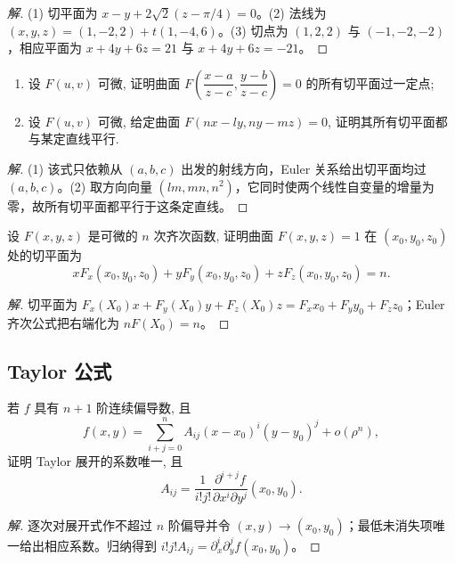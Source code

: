 \documentclass[../../数学分析培优讲义(答案版).tex]{subfiles}
\begin{document}
\begin{proof}[解]
(1) 切平面为 $x-y+2\sqrt{2}(z-\pi/4)=0$。(2) 法线为 $(x,y,z)=(1,-2,2)+t(1,-4,6)$。(3) 切点为 $(1,2,2)$ 与 $(-1,-2,-2)$，相应平面为 $x+4y+6z=21$ 与 $x+4y+6z=-21$。
\end{proof}

\begin{example}
\begin{enumerate}[label=(\arabic*)]
    \item 设 $F(u,v)$ 可微, 证明曲面 $\displaystyle F\left(\dfrac{x-a}{z-c},\dfrac{y-b}{z-c}\right)=0$ 的所有切平面过一定点;
    \item 设 $F(u,v)$ 可微, 给定曲面 $F(nx-ly,ny-mz)=0$, 证明其所有切平面都与某定直线平行.
\end{enumerate}
\end{example}

\begin{proof}[解]
(1) 该式只依赖从 $(a,b,c)$ 出发的射线方向，Euler 关系给出切平面均过 $(a,b,c)$。(2) 取方向向量 $(lm,mn,n^2)$，它同时使两个线性自变量的增量为零，故所有切平面都平行于这条定直线。
\end{proof}

\begin{example}
设 $F(x,y,z)$ 是可微的 $n$ 次齐次函数, 证明曲面 $F(x,y,z)=1$ 在 $(x_0,y_0,z_0)$ 处的切平面为
\[
    xF_x(x_0,y_0,z_0)+yF_y(x_0,y_0,z_0)+zF_z(x_0,y_0,z_0)=n.
\]
\end{example}

\begin{proof}[解]
切平面为 $F_x(X_0)x+F_y(X_0)y+F_z(X_0)z=F_xx_0+F_yy_0+F_zz_0$；Euler 齐次公式把右端化为 $nF(X_0)=n$。
\end{proof}

\subsection{Taylor 公式}

\begin{example}[\markstar]
若 $f$ 具有 $n+1$ 阶连续偏导数, 且
\[
    f(x,y)=\sum\limits_{i+j=0}^nA_{ij}(x-x_0)^i(y-y_0)^j+o(\rho^n),
\]
证明 Taylor 展开的系数唯一, 且
\[
    A_{ij}=\dfrac{1}{i!j!}
    \dfrac{\partial^{i+j}f}{\partial x^i\partial y^j}(x_0,y_0).
\]
\end{example}

\begin{proof}[解]
逐次对展开式作不超过 $n$ 阶偏导并令 $(x,y)\to(x_0,y_0)$；最低未消失项唯一给出相应系数。归纳得到 $i!j!A_{ij}=\partial_x^i\partial_y^jf(x_0,y_0)$。
\end{proof}
\end{document}
